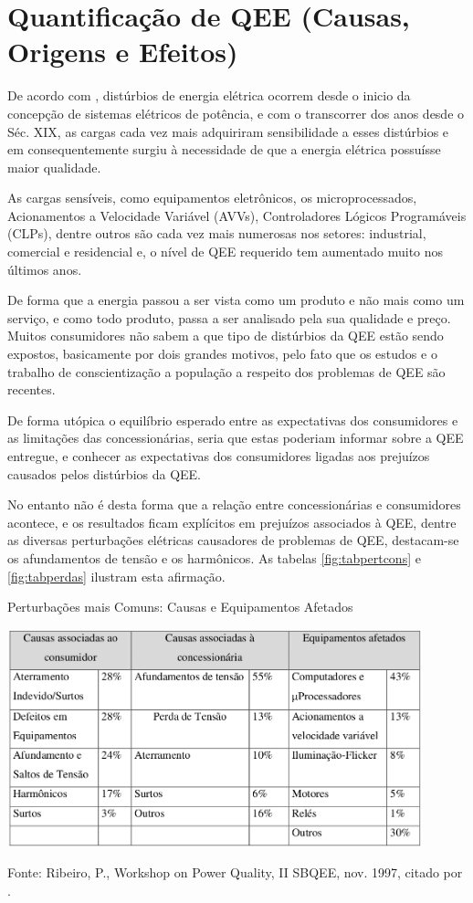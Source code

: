 \section{Quantificação de QEE (Causas, Origens e Efeitos)}
\par
De acordo com \cite{ALV10}, distúrbios de energia elétrica ocorrem desde o inicio da concepção de sistemas elétricos de potência, e com o transcorrer dos anos desde o Séc. XIX, as cargas cada vez mais adquiriram sensibilidade a esses distúrbios e em consequentemente surgiu à necessidade de que a energia elétrica possuísse maior qualidade.
\par
As cargas sensíveis, como equipamentos eletrônicos, os microprocessados, Acionamentos a Velocidade Variável (AVVs), Controladores Lógicos Programáveis (CLPs), dentre outros são cada vez mais numerosas nos setores: industrial, comercial e residencial e, o nível de QEE requerido tem aumentado muito nos últimos anos. 
\par De forma que a energia passou a ser vista como um produto e não mais como um serviço, e como todo produto, passa a ser analisado pela sua qualidade e preço. Muitos consumidores não sabem a que tipo de distúrbios da QEE estão sendo expostos, basicamente por dois grandes motivos, pelo fato que os estudos e o trabalho de conscientização a população a respeito dos problemas de QEE são recentes. 
\par
De forma utópica o equilíbrio esperado entre as expectativas dos consumidores e as limitações das concessionárias, seria que estas poderiam informar sobre a QEE entregue, e conhecer as expectativas dos consumidores ligadas aos prejuízos causados pelos distúrbios da QEE.
\par
No entanto não é desta forma que a relação entre concessionárias e consumidores acontece, e os resultados ficam explícitos em prejuízos associados à QEE, dentre as diversas perturbações elétricas causadores de problemas de QEE, destacam-se os afundamentos de tensão e os harmônicos. As tabelas \ref{fig:tabpertcons} e \ref{fig:tabperdas} ilustram esta afirmação.
\begin{table}[!h]
\begin{center}
\caption{Perturbações mais Comuns: Causas e Equipamentos Afetados}
\includegraphics[width=12cm]{imagens/tab2-cap2.png}
\par{\small Fonte: Ribeiro, P., Workshop on Power Quality, II SBQEE, nov. 1997, citado por \cite{ALV10}.}
\label{fig:tabpertcons}
\end{center}
\end{table}
